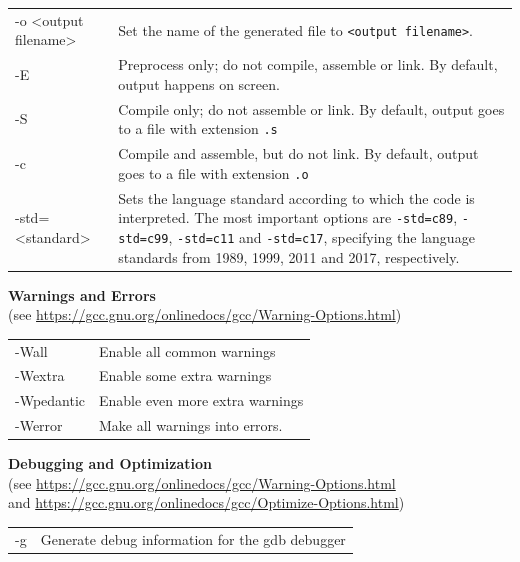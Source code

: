 \begin{appendices}
\begin{table}[h!]
\begin{tabularx}
	{\linewidth}
	{OE}
	-o <output filename> &
	Set the name of the generated file to \texttt{<output filename>}.
	\\
	
	-E &
	Preprocess only; do not compile, assemble or link. By default, output happens on screen.
	\\
	
	-S &
	Compile only; do not assemble or link. By default, output goes to a file with extension \texttt{.s}
	\\
	
	-c &
	Compile and assemble, but do not link. By default, output goes to a file with extension \texttt{.o}
	\\
	
	-std=<standard> &
	Sets the language standard according to which the code is interpreted. The most important options are \texttt{-std=c89},
	\texttt{-std=c99}, \texttt{-std=c11} and \texttt{-std=c17}, specifying the language standards from 1989, 1999, 2011 and 2017, respectively.
\end{tabularx}

\vspace{6pt}
\textbf{Warnings and Errors} \\
(see \url{https://gcc.gnu.org/onlinedocs/gcc/Warning-Options.html})

\begin{tabularx}
	{\linewidth}
	{OE}
	-Wall &
	Enable all common warnings
	\\
	
	-Wextra &
	Enable some extra warnings
	\\
	
	-Wpedantic &
	Enable even more extra warnings
	\\
	
	-Werror &
	Make all warnings into errors.
\end{tabularx}

\vspace{6pt}
\textbf{Debugging and Optimization} \\
(see \url{https://gcc.gnu.org/onlinedocs/gcc/Warning-Options.html}\\
 and \url{https://gcc.gnu.org/onlinedocs/gcc/Optimize-Options.html})

\begin{tabularx}
	{\linewidth}
	{OE}
	-g &
	Generate debug information for the gdb debugger
	\\
	

\end{tabularx}
\end{table}
\end{appendices}
